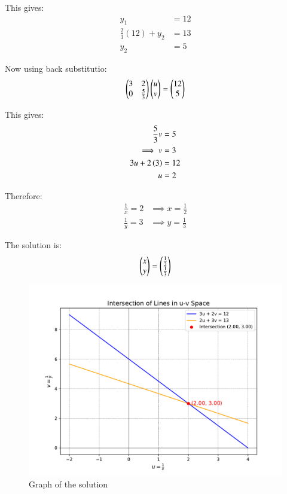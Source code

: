 \documentclass[journal]{IEEEtran}
\begin{document}
This gives:
\begin{align}
    y_1 &= 12\\
    \frac{2}{3}(12) + y_2 &= 13\\
    y_2 &= 5
\end{align}

Now using back substitutio:
\begin{align}
    \begin{pmatrix}3 & 2\\0 & \frac{5}{3}\end{pmatrix}\begin{pmatrix}u\\v\end{pmatrix} = \begin{pmatrix}12\\ 5\end{pmatrix}
\end{align}

This gives:
\begin{align}
      \frac{5}{3}v&=5\\
      \implies v&=3\\
    3u + 2\left(3\right)&= 12\\
    u &= 2
\end{align}

Therefore:
\begin{align}
    \frac{1}{x} =2 &\implies x = \frac{1}{2}\\
    \frac{1}{y} = 3 &\implies y = \frac{1}{3}
\end{align}

The solution is:
\begin{align}
    \begin{pmatrix}x\\y\end{pmatrix} = \begin{pmatrix}\frac{1}{2}\\ \frac{1}{3}\end{pmatrix}
 \end{align}

\begin{figure}[h!]
   \centering
	 \includegraphics[width=\textwidth]{figs/fig.pdf}
   \caption{Graph of the solution}
\end{figure}
\end{document}
